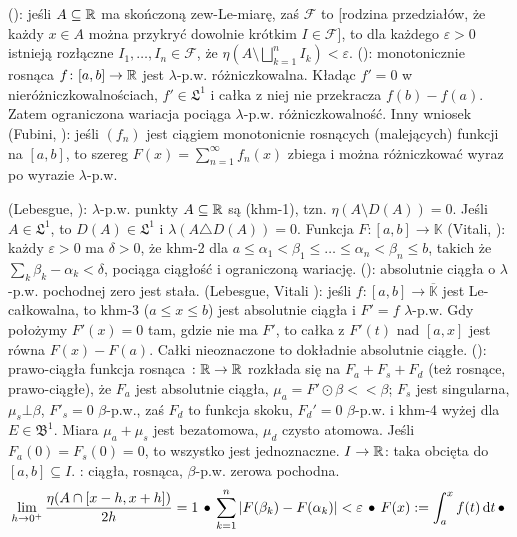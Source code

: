   (): jeśli $A \subseteq \mathbb{R}$ ma skończoną zew-Le-miarę, zaś $\mathcal F$ to  [rodzina przedziałów, że każdy $x \in A$ można przykryć dowolnie krótkim $I \in \mathcal F$], to dla każdego $\varepsilon > 0$ istnieją rozłączne $I_1, \dots, I_n \in \mathcal F$, że $\eta(A \setminus \bigsqcup_{k=1}^n I_k) < \varepsilon$.
 (): monotonicznie rosnąca $f \colon [a,b] \to \mathbb{R}$ jest $\lambda$-p.w. różniczkowalna.
Kładąc $f' = 0$ w nieróżniczkowalnościach, $f' \in \mathfrak L^1$ i całka z niej nie przekracza $f(b) - f(a)$.
Zatem ograniczona wariacja pociąga $\lambda$-p.w. różniczkowalność.
Inny wniosek (Fubini, ): jeśli $(f_n)$ jest ciągiem monotonicnie rosnących (malejących) funkcji na $[a,b]$, to szereg $F(x) = \sum_{n=1}^\infty f_n(x)$ zbiega i można różniczkować wyraz po wyrazie $\lambda$-p.w.

 (Lebesgue, ): $\lambda$-p.w. punkty $A \subseteq \mathbb{R}$ są  (khm-1), tzn. $\eta (A \setminus D(A)) = 0$.
Jeśli $A \in \mathfrak L^1$, to $D(A) \in \mathfrak L^1$ i $\lambda(A \triangle D(A)) = 0$.
Funkcja $F \colon [a,b] \to \mathbb K$  (Vitali, ): każdy $\varepsilon > 0$ ma $\delta > 0$, że khm-2 dla $a \le \alpha_1 < \beta_1 \le \ldots \le \alpha_n < \beta_n \le b$, takich że $\sum_k \beta_k - \alpha_k < \delta$, pociąga ciągłość i ograniczoną wariację.
 (): absolutnie ciągła o $\lambda$-p.w. pochodnej zero jest stała.
 (Lebesgue, Vitali ): jeśli $f \colon [a,b] \to \overline {\mathbb K}$ jest Le-całkowalna, to khm-3 ($a \le x \le b$) jest absolutnie ciągła i $F' = f$ $\lambda$-p.w.
Gdy położymy $F'(x) = 0$ tam, gdzie nie ma $F'$, to całka z $F'(t)$ nad $[a,x]$ jest równa $F(x) - F(a)$.
Całki nieoznaczone to dokładnie absolutnie ciągłe.
 (): prawo-ciągła funkcja rosnąca $ \colon \mathbb{R} \to \mathbb{R}$ rozkłada się na $F_a + F_s + F_d$ (też rosnące, prawo-ciągłe), że $F_a$ jest absolutnie ciągła, $\mu_a = F' \odot \beta << \beta$; $F_s$ jest singularna, $\mu_s \bot \beta$, $F'_s = 0$ $\beta$-p.w., zaś $F_d$ to funkcja skoku, $F_d' = 0$ $\beta$-p.w. i khm-4 wyżej dla $E \in \mathfrak B^1$.
Miara $\mu_a + \mu_s$ jest bezatomowa, $\mu_d$ czysto atomowa.
Jeśli $F_a(0) = F_s(0) = 0$, to wszystko jest jednoznaczne.
 $I \to \mathbb{R}$: taka obcięta do $[a,b] \subseteq I$.
: ciągła, rosnąca, $\beta$-p.w. zerowa pochodna.
\[
	\lim_{h \to 0^+} \frac{\eta(A \cap [x-h, x+h])}{2h} = 1 \, \bullet \,
	\sum_{k=1}^n |F(\beta_k) - F(\alpha_k)| < \varepsilon \, \bullet \,
	F(x) := \int_a^x f(t) \,\textrm{d}t \, \bullet \,
\]
